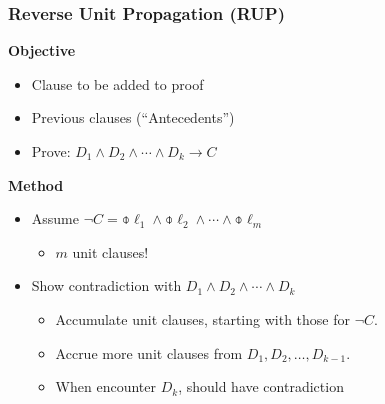 \documentclass[t,pdf]{beamer}
\begin{document}
\begin{frame}
  \frametitle{Reverse Unit Propagation (RUP)}

  {\bf Objective}
  \begin{itemize}
    \item {} Clause to be added to proof
    \item {} Previous clauses (``Antecedents'')
    \item Prove: $D_1 \land D_2 \land \cdots \land D_k \rightarrow C$ 
  \end{itemize}
{\bf Method}
\begin{itemize}
\item Assume $\neg C = \obar{\ell}_1 \land \obar{\ell}_2 \land \cdots \land \obar{\ell}_m$
  \begin{itemize}
    \item $m$ unit clauses!
  \end{itemize}
\item Show contradiction with $D_1 \land D_2 \land \cdots \land D_k$ 
  \begin{itemize}
  \item Accumulate unit clauses, starting with those for $\neg C$.
  \item Accrue more unit clauses from $D_1, D_2, \ldots, D_{k-1}$.
  \item When encounter $D_k$, should have contradiction
  \end{itemize}
\end{itemize}

\end{frame}
\end{document}
